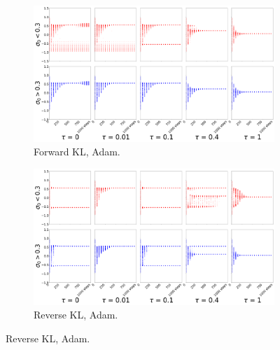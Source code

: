 \documentclass{article}
\begin{document}
\begin{figure}[!ht]
  \centering
  \begin{subfigure}[b]{0.4\linewidth}
    \centering
    \includegraphics[width=1\columnwidth]{figs/bandit/notlearnQ/modes=1/adam/mean_forward_optim=adam_modes=1_lr=0.01.png}
    \caption{Forward KL, Adam.}
    \label{fig:bandit-mean-forward-adam}
  \end{subfigure}%
  \begin{subfigure}[b]{0.4\linewidth}
    \centering
    \includegraphics[width=1\columnwidth]{figs/bandit/notlearnQ/modes=1/adam/mean_reverse_optim=adam_modes=1_lr=0.01.png}
    \caption{Reverse KL, Adam. }
    \label{fig:bandit-mean-reverse-adam}
  \end{subfigure}
  

\end{figure}
\end{document}

